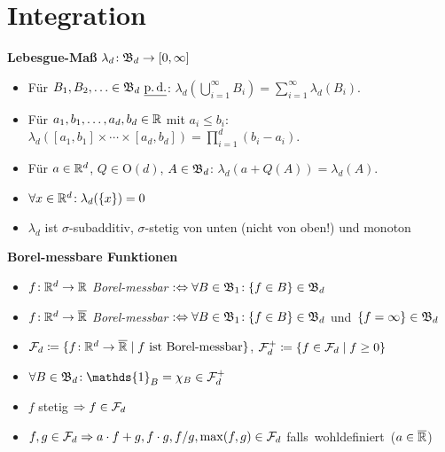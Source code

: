 \section{Integration}

\textbf{Lebesgue-Maß} $\lambda_d\!: \mathfrak{B}_d \to [0,\infty]$
\begin{itemize}
\item Für $B_1,B_2,\ldots\in\B_d\ \pd$:\:
  $\lambda_d(\bigcup_{i=1}^{\infty} B_i) = \sum_{i=1}^{\infty} \lambda_d(B_i)$.

\item Für $a_1,b_1,\ldots,a_d,b_d\in\mathbb{R}$ mit $a_i \leq b_i$:\:\:
  \mbox{$\lambda_d([a_1,b_1] \times\cdots\times [a_d,b_d]) =
  \prod_{i=1}^{d} (b_i-a_i)$.}

\item Für $a\in\mathbb{R}^d$, $Q\in\mathrm{O}(d)$, $A\in\mathfrak{B}_d$:
  $\lambda_d(a+Q(A)) = \lambda_d(A)$.

\item $\forall x\in\mathbb{R}^d\!: \lambda_d(\{x\}) = 0$

\item $\lambda_d$ ist $\sigma$-subadditiv, $\sigma$-stetig von unten
  (nicht von oben!) und monoton
\end{itemize}

\textbf{Borel-messbare Funktionen}
\begin{itemize}
\item $f\!: \mathbb{R}^d\to\mathbb{R}$ \textit{Borel-messbar}
  $:\Leftrightarrow \forall B\in\mathfrak{B}_1\!: \{f \in B\} \in\mathfrak{B}_d$

\item $f\!: \mathbb{R}^d\to\overline{\mathbb{R}}$ \textit{Borel-messbar}
  $:\Leftrightarrow \forall B\in\mathfrak{B}_1\!: \{f \in B\} \in\mathfrak{B}_d$
  \mbox{und $\{f = \infty\} \in\mathfrak{B}_d$}

\item $\mathcal{F}_d \coloneqq \{f\!: \mathbb{R}^d \to \overline{\mathbb{R}} \mid f \text{ ist Borel-messbar}\}$,
  $\mathcal{F}_d^+ \coloneqq \{f\in\mathcal{F}_d \mid f \geq 0\}$

\item $\forall B\in\B_d\!: \mathds{1}_B=\chi_B\in\F_d^+$

\item $f$ stetig $\Rightarrow f\in\mathcal{F}_d$

\item $f,g\in\mathcal{F}_d \Rightarrow a \cdot f + g, f \cdot g, f/g,
  \operatorname{max}(f,g)\in\mathcal{F}_d$ \mbox{falls wohldefiniert ($a\in\overline{\mathbb{R}}$)}
\end{itemize}


